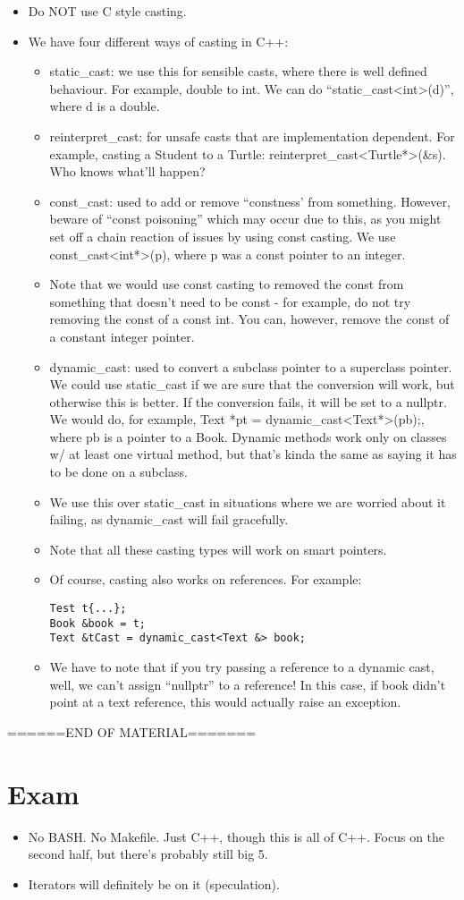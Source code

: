\documentclass{article}
\begin{document}
\begin{itemize}
\item Do NOT use C style casting.
\item We have four different ways of casting in C++:
\begin{itemize}
\item static\_cast: we use this for sensible casts, where there is well defined behaviour.  For example, double to int.  We can do ``static\_cast<int>(d)'', where d is a double.
\item reinterpret\_cast: for unsafe casts that are implementation dependent.  For example, casting a Student to a Turtle: reinterpret\_cast<Turtle*>(&s).  Who knows what'll happen?
\item const\_cast: used to add or remove ``constness' from something.  However, beware of ``const poisoning'' which may occur due to this, as you might set off a chain reaction of issues by using const casting.  We use const\_cast<int*>(p), where p was a const pointer to an integer.  
\item Note that we would use const casting to removed the const from something that doesn't need to be const - for example, do not try removing the const of a const int.  You can, however, remove the const of a constant integer pointer.
\item dynamic\_cast: used to convert a subclass pointer to a superclass pointer.  We could use static\_cast if we are sure that the conversion will work, but otherwise this is better.  If the conversion fails, it will be set to a nullptr.  We would do, for example, Text *pt = dynamic\_cast<Text*>(pb);, where pb is a pointer to a Book.  Dynamic methods work only on classes w/ at least one virtual method, but that's kinda the same as saying it has to be done on a subclass.  
\item We use this over static\_cast in situations where we are worried about it failing, as dynamic\_cast will fail gracefully.
\item Note that all these casting types will work on smart pointers.
\item Of course, casting also works on references.  For example:
\begin{lstlisting}
Test t{...};
Book &book = t;
Text &tCast = dynamic_cast<Text &> book;
\end{lstlisting}
\item We have to note that if you try passing a reference to a dynamic cast, well, we can't assign ``nullptr'' to a reference!  In this case, if book didn't point at a text reference, this would actually raise an exception.
\end{itemize}
\end{itemize}

======END OF MATERIAL=======

\section{Exam}
\begin{itemize}
\item No BASH.  No Makefile.  Just C++, though this is all of C++.  Focus on the second half, but there's probably still big 5.
\item Iterators will definitely be on it (speculation).

\end{itemize}
\end{document}
